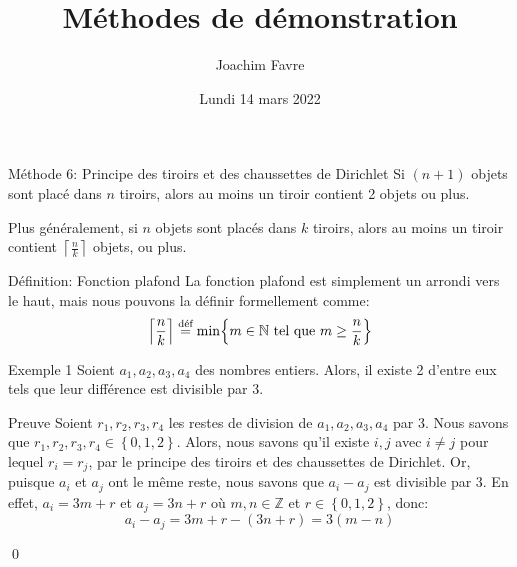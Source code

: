 \documentclass[a4paper]{article}
\title{Méthodes de démonstration}
\author{Joachim Favre}
\date{Lundi 14 mars 2022}
\begin{document}
\maketitle


\begin{parag}{Méthode 6: Principe des tiroirs et des chaussettes de Dirichlet}
    Si $\left(n+1\right)$ objets sont placé dans $n$ tiroirs, alors au moins un tiroir contient 2 objets ou plus.

    Plus généralement, si $n$ objets sont placés dans $k$ tiroirs, alors au moins un tiroir contient $\left\lceil \frac{n}{k} \right\rceil $ objets, ou plus.

    \begin{subparag}{Définition: Fonction plafond}
        La fonction plafond est simplement un arrondi vers le haut, mais nous pouvons la définir formellement comme: 
        \[\left\lceil \frac{n}{k} \right\rceil \over{=}{déf} \min\left\{m \in\mathbb{N} \telque m \geq \frac{n}{k}\right\}\]

    \end{subparag}
    
\end{parag}

\begin{parag}{Exemple 1}
    Soient $a_1, a_2, a_3, a_4$ des nombres entiers. Alors, il existe 2 d'entre eux tels que leur différence est divisible par 3.

    \begin{subparag}{Preuve}
        Soient $r_1, r_2, r_3, r_4$ les restes de division de $a_1, a_2, a_3, a_4$ par 3. Nous savons que $r_1, r_2, r_3, r_4 \in \left\{0, 1, 2\right\}$. Alors, nous savons qu'il existe $i, j$ avec $i \neq j$ pour lequel $r_i = r_j$, par le principe des tiroirs et des chaussettes de Dirichlet. Or, puisque $a_i$ et $a_j$ ont le même reste, nous savons que $a_i - a_j$ est divisible par 3. En effet, $a_i = 3m + r$ et $a_j = 3n + r$ où $m, n \in \mathbb{Z}$ et $r \in \left\{0, 1, 2\right\}$, donc:
        \[a_i - a_j = 3m + r - \left(3n + r\right) = 3\left(m - n\right)\]

        \qed
    \end{subparag}
\end{parag}
\end{document}
